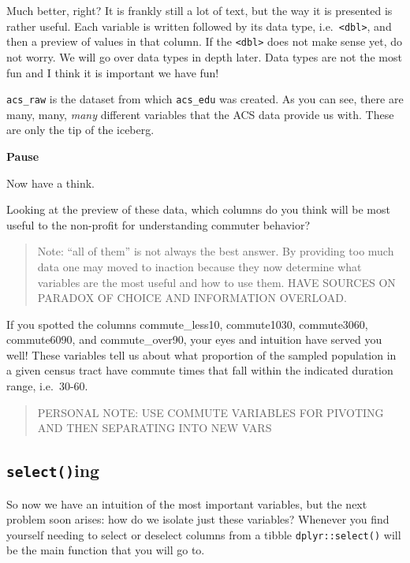 \documentclass[
]{book}
\begin{document}
Much better, right? It is frankly still a lot of text, but the way it is presented is rather useful. Each variable is written followed by its data type, i.e.~\texttt{\textless{}dbl\textgreater{}}, and then a preview of values in that column. If the \texttt{\textless{}dbl\textgreater{}} does not make sense yet, do not worry. We will go over data types in depth later. Data types are not the most fun and I think it is important we have fun!

\texttt{acs\_raw} is the dataset from which \texttt{acs\_edu} was created. As you can see, there are many, many, \emph{many} different variables that the ACS data provide us with. These are only the tip of the iceberg.

\textbf{Pause}

Now have a think.

Looking at the preview of these data, which columns do you think will be most useful to the non-profit for understanding commuter behavior?

\begin{quote}
Note: ``all of them'' is not always the best answer. By providing too much data one may moved to inaction because they now determine what variables are the most useful and how to use them. HAVE SOURCES ON PARADOX OF CHOICE AND INFORMATION OVERLOAD.
\end{quote}

If you spotted the columns commute\_less10, commute1030, commute3060, commute6090, and commute\_over90, your eyes and intuition have served you well! These variables tell us about what proportion of the sampled population in a given census tract have commute times that fall within the indicated duration range, i.e.~30-60.

\begin{quote}
PERSONAL NOTE: USE COMMUTE VARIABLES FOR PIVOTING AND THEN SEPARATING INTO NEW VARS
\end{quote}

\hypertarget{selecting}{%
\subsection{\texorpdfstring{\texttt{select()}ing}{select()ing}}\label{selecting}}

So now we have an intuition of the most important variables, but the next problem soon arises: how do we isolate just these variables? Whenever you find yourself needing to select or deselect columns from a tibble \texttt{dplyr::select()} will be the main function that you will go to.
\end{document}
